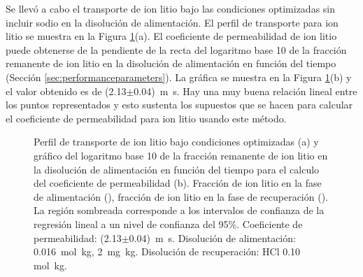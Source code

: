 Se llevó a cabo el transporte de ion litio bajo las condiciones optimizadas sin incluir sodio en la di\-so\-lu\-ción de alimentación. El perfil de transporte para ion litio se muestra en la Figura \ref{fig:optim10}(a). El coeficiente de permeabilidad de ion litio puede obtenerse de la pendiente de la recta del logaritmo base 10 de la fracción remanente de ion litio en la disolución de alimentación en función del tiempo (Sección \ref{sec:performanceparameters}). La gráfica se muestra en la  Figura \ref{fig:optim10}(b) y el valor obtenido es de (2.13$\pm$0.04)~m~s\mnn. Hay una muy buena relación lineal entre los puntos representados y esto sustenta los supuestos que se hacen para calcular el coeficiente de permeabilidad para ion litio usando este método.
\begin{figure}[H]
    \centering
    \caption[Perfil de transporte de ion litio del sistema optimizado.]{Perfil de transporte de ion litio bajo condiciones optimizadas (a) y gráfico del logaritmo base 10 de la fracción remanente de ion litio en la disolución de alimentación en función del tiempo para el calculo del coeficiente de permeabilidad (b). Fracción de ion litio en la fase de alimentación (\protect\squareblck), fracción de ion litio en la fase de recuperación (\protect\squarewht). La región sombreada corresponde a los intervalos de confianza de la regresión lineal a un nivel de confianza del 95\%. Coeficiente de permeabilidad: (2.13$\pm$0.04)~m~s\mnn. Disolución de alimentación:  0.016~mol~kg\mnn,  2~mg~kg\mnn. Disolución de recuperación: HCl 0.10 mol~kg\mnn.}
    \label{fig:optim10}
\end{figure}

\clearpage

\clearpage{}